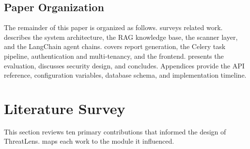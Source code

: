 \documentclass[conference]{IEEEtran}
\begin{document}
\subsection{Paper Organization}
The remainder of this paper is organized as follows.  surveys
related work.  describes the system architecture,
 the RAG knowledge base,  the scanner layer, and
 the LangChain agent chains.  covers report
generation,  the Celery task pipeline, 
authentication and multi-tenancy, and  the frontend.
 presents the evaluation,  discusses security
design, and  concludes. Appendices provide the API
reference, configuration variables, database schema, and implementation timeline.

\section{Literature Survey}
\label{sec:related}
This section reviews ten primary contributions that informed the design of
ThreatLens.  maps each work to the module it influenced.
\end{document}
